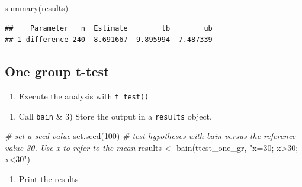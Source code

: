 \documentclass[
]{book}
\newenvironment{Shaded}{\begin{snugshade}}{\end{snugshade}}
\newcommand{\CommentTok}[1]{\textcolor[rgb]{0.56,0.35,0.01}{\textit{#1}}}
\newcommand{\DecValTok}[1]{\textcolor[rgb]{0.00,0.00,0.81}{#1}}
\newcommand{\FunctionTok}[1]{\textcolor[rgb]{0.00,0.00,0.00}{#1}}
\newcommand{\NormalTok}[1]{#1}
\newcommand{\OtherTok}[1]{\textcolor[rgb]{0.56,0.35,0.01}{#1}}
\newcommand{\SpecialCharTok}[1]{\textcolor[rgb]{0.00,0.00,0.00}{#1}}
\newcommand{\StringTok}[1]{\textcolor[rgb]{0.31,0.60,0.02}{#1}}
\providecommand{\tightlist}{%
  \setlength{\itemsep}{0pt}\setlength{\parskip}{0pt}}
\begin{document}
\begin{Shaded}
\begin{Highlighting}[]
\FunctionTok{summary}\NormalTok{(results)}
\end{Highlighting}
\end{Shaded}

\begin{verbatim}
##    Parameter   n  Estimate        lb        ub
## 1 difference 240 -8.691667 -9.895994 -7.487339
\end{verbatim}

\hypertarget{one-group-t-test}{%
\subsection{One group t-test}\label{one-group-t-test}}

\begin{enumerate}
\def\labelenumi{\arabic{enumi})}
\tightlist
\item
  Execute the analysis with \texttt{t\_test()}
\end{enumerate}

\begin{Shaded}
\end{Shaded}

\begin{enumerate}
\def\labelenumi{\arabic{enumi})}
\setcounter{enumi}{1}
\tightlist
\item
  Call \texttt{bain} \& 3) Store the output in a \texttt{results} object.
\end{enumerate}

\begin{Shaded}
\begin{Highlighting}[]
\CommentTok{\# set a seed value}
\FunctionTok{set.seed}\NormalTok{(}\DecValTok{100}\NormalTok{)}
\CommentTok{\# test hypotheses with bain versus the reference value 30. Use x to refer to the mean}
\NormalTok{results }\OtherTok{\textless{}{-}} \FunctionTok{bain}\NormalTok{(ttest\_one\_gr, }\StringTok{"x=30; x\textgreater{}30; x\textless{}30"}\NormalTok{)}
\end{Highlighting}
\end{Shaded}

\begin{enumerate}
\def\labelenumi{\arabic{enumi})}
\setcounter{enumi}{2}
\tightlist
\item
  Print the results
\end{enumerate}
\end{document}
